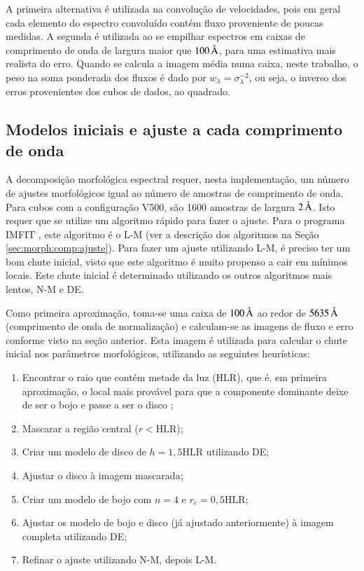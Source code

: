 A primeira alternativa é utilizada na convolução de velocidades, pois em geral
cada elemento do espectro convoluído contém fluxo proveniente de poucas medidas.
A segunda é utilizada ao se empilhar espectros em caixas de comprimento de onda
de largura maior que $100\,\text{\normalfont\AA}$, para uma estimativa mais realista do
erro. Quando se calcula a imagem média numa caixa, neste trabalho, o peso na
soma ponderada dos fluxos é dado por $w_\lambda = \sigma_\lambda^{-2}$, ou seja,
o inverso dos erros provenientes dos cubos de dados, ao quadrado.


\subsection{Modelos iniciais e ajuste a cada comprimento de onda}
\label{sec:Decomp:initmodel}

A decomposição morfológica espectral requer, nesta implementação, um número de
ajustes morfológicos igual ao número de amostras de comprimento de onda. Para
cubos com a configuração V500, são 1600 amostras de largura $2\,\text{\normalfont\AA}$. Isto
requer que se utilize um algoritmo rápido para fazer o ajuste. Para o programa
IMFIT \citep{Erwin2015}, este algoritmo é o L-M (ver a descrição dos algoritmos
na Seção \ref{sec:morph:comp:ajuste}). Para fazer um ajuste utilizando L-M, é
preciso ter um bom chute inicial, visto que este algoritmo é muito propenso a
cair em mínimos locais. Este chute inicial é determinado utilizando os outros
algoritmos mais lentos, N-M e DE.

Como primeira aproximação, toma-se uma caixa de $100\,\text{\normalfont\AA}$ ao redor de
$5635\,\text{\normalfont\AA}$ (comprimento de onda de normalização) e calculam-se as imagens
de fluxo e erro conforme visto na seção anterior. Esta imagem é utilizada para
calcular o chute inicial nos parâmetros morfológicos, utilizando as seguintes
heurísticas:
\begin{enumerate}
  \item Encontrar o raio que contém metade da luz ($\mathrm{HLR}$), que é, em
  primeira aproximação, o local mais provável para que a componente dominante
  deixe de ser o bojo e passe a ser o disco \citep{GonzalezDelgado2015};
  \item Mascarar a região central ($r < \mathrm{HLR}$);
  \item Criar um modelo de disco de $h=1,5 \mathrm{HLR}$ utilizando DE;
  \item Ajustar o disco à imagem mascarada;
  \item Criar um modelo de bojo com $n = 4$ e $r_e = 0,5 \mathrm{HLR}$;
  \item Ajustar os modelo de bojo e disco (já ajustado anteriormente) à imagem
  completa utilizando DE;
  \item Refinar o ajuste utilizando N-M, depois L-M.
\end{enumerate}

